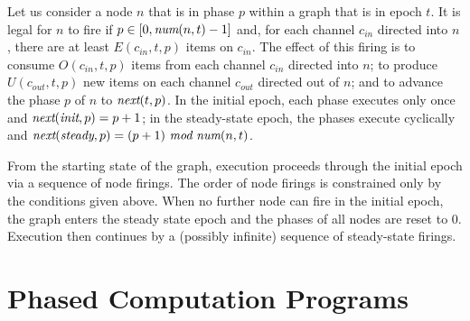 Let us consider a node $n$ that is in phase $p$ within a graph that is
in epoch $t$.  It is legal for $n$ to fire if $p \in [0, \mbox{\it num}(n,
t)-1]$ and, for each channel $c_{in}$ directed into $n$, there are at
least $E(c_{in}, t, p)$ items on $c_{in}$.  The effect of this firing
is to consume $O(c_{in}, t, p)$ items from each channel $c_{in}$
directed into $n$; to produce $U(c_{out}, t, p)$ new items on each
channel $c_{out}$ directed out of $n$; and to advance the phase $p$ of
$n$ to $\mbox{\it next}(t, p)$.  In the initial epoch, each phase executes
only once and $\mbox{\it next}(\mbox{\it init}, p) = p + 1$; in the
steady-state epoch, the phases execute cyclically and
$\mbox{\it next}(\mbox{\it steady}, p) = (p + 1)~\mbox{\it mod}~\mbox{\it num}(n, t)$.

From the starting state of the graph, execution proceeds through the
initial epoch via a sequence of node firings.  The order of node
firings is constrained only by the conditions given above.  When no
further node can fire in the initial epoch, the graph enters the
steady state epoch and the phases of all nodes are reset to 0.
Execution then continues by a (possibly infinite) sequence of
steady-state firings.

\section{Phased Computation Programs}


